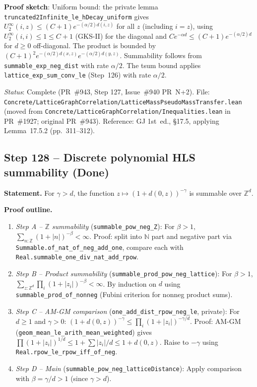 \documentclass[a4paper,11pt]{article}
\begin{document}
\noindent\textbf{Proof sketch}:
Uniform bound: the private lemma \texttt{truncated2Infinite\_le\_hDecay\_uniform}
gives $U_2^\infty(i,z) \leq (C+1) e^{-(\alpha/2)d(i,z)}$ for all $z$ (including $i=z$),
using $U_2^\infty(i,i) \leq 1 \leq C+1$ (GKS-II) for the diagonal and
$C e^{-\alpha d} \leq (C+1) e^{-(\alpha/2)d}$ for $d \geq 0$ off-diagonal.
The product is bounded by $(C+1)^2 e^{-(\alpha/2)d(x,z)} e^{-(\alpha/2)d(y,z)}$.
Summability follows from \texttt{summable\_exp\_neg\_dist} with rate $\alpha/2$.
The tsum bound applies \texttt{lattice\_exp\_sum\_conv\_le} (Step~126) with rate $\alpha/2$.

\noindent\textit{Status}: Complete (PR~\#943, Step 127, Issue~\#940 PR~N+2).
File: \texttt{Concrete/LatticeGraphCorrelation/LatticeMassPseudoMassTransfer.lean} (moved from \texttt{Concrete/LatticeGraphCorrelation/Inequalities.lean} in PR~\#1927; original PR~\#943).
Reference: GJ 1st~ed., \S17.5, applying Lemma~17.5.2 (pp.~311--312).

\subsection*{Step 128 -- Discrete polynomial HLS summability (Done)}

\noindent\textbf{Statement.}
For $\gamma > d$, the function $z \mapsto (1 + d(0,z))^{-\gamma}$ is summable over $\mathbb{Z}^d$.

\noindent\textbf{Proof outline.}
\begin{enumerate}
\item \emph{Step A -- $\mathbb{Z}$ summability} (\texttt{summable\_pow\_neg\_Z}):
  For $\beta > 1$, $\sum_{n:\mathbb{Z}} (1+|n|)^{-\beta} < \infty$.
  Proof: split into $\mathbb{N}$ part and negative part via
  \texttt{Summable.of\_nat\_of\_neg\_add\_one}, compare each with
  \texttt{Real.summable\_one\_div\_nat\_add\_rpow}.

\item \emph{Step B -- Product summability} (\texttt{summable\_prod\_pow\_neg\_lattice}):
  For $\beta > 1$,
  $\sum_{z:\mathbb{Z}^d} \prod_i (1+|z_i|)^{-\beta} < \infty$.
  By induction on $d$ using \texttt{summable\_prod\_of\_nonneg}
  (Fubini criterion for nonneg product sums).

\item \emph{Step C -- AM-GM comparison} (\texttt{one\_add\_dist\_rpow\_neg\_le}, private):
  For $d \geq 1$ and $\gamma > 0$:
  $(1 + d(0,z))^{-\gamma} \leq \prod_i (1+|z_i|)^{-\gamma/d}$.
  Proof: AM-GM (\texttt{geom\_mean\_le\_arith\_mean\_weighted}) gives
  $\prod (1+|z_i|)^{1/d} \leq 1 + \sum|z_i|/d \leq 1 + d(0,z)$.
  Raise to $-\gamma$ using \texttt{Real.rpow\_le\_rpow\_iff\_of\_neg}.

\item \emph{Step D -- Main} (\texttt{summable\_pow\_neg\_latticeDistance}):
  Apply comparison with $\beta = \gamma/d > 1$ (since $\gamma > d$).
\end{enumerate}
\end{document}
